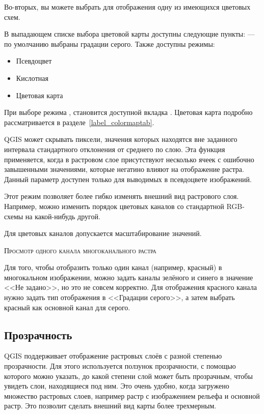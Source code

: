 Во-вторых, вы можете выбрать для отображения одну из имеющихся цветовых схем.

В выпадающем списке выбора цветовой карты доступны следующие пункты:
 --- по умолчанию выбраны градации серого. Также доступны режимы:
\begin{itemize}[label=--]
\item Псевдоцвет
\item Кислотная
\item Цветовая карта
\end{itemize}

При выборе режима , становится
доступной вкладка . Цветовая карта подробно рассматривается в разделе~\ref{label_colormaptab}.

QGIS может скрывать пиксели, значения которых находятся вне заданного
интервала стандартного отклонения от среднего по слою.
Эта функция применяется, когда в растровом слое присутствуют несколько ячеек
с ошибочно завышенными значениями, которые негатино влияют на отображение растра.
Данный параметр доступен только для выводимых в псевдоцвете изображений.


Этот режим позволяет более гибко изменять внешний вид растрового слоя.
Например, можно изменить порядок цветовых каналов со стандартной RGB-схемы на
какой-нибудь другой.

Для цветовых каналов допускается масштабирование значений.


\begin{Tip}\caption{\textsc{Просмотр одного канала многоканального растра}}
Для того, чтобы отобразить только один канал (например, красный) в
многокальном изображении, можно задать каналы зелёного и синего в значение
<<Не задано>>, но это не совсем корректно. Для отображения красного
канала нужно задать тип отображения в <<Градации серого>>, а затем
выбрать красный как основной канал для серого.
\end{Tip}

\subsection{Прозрачность} \label{rastertab:transparency}

QGIS поддерживает отображение растровых слоёв с разной степенью
прозрачности. Для этого используется
ползунок прозрачности, с помощью которого можно указать, до какой
степени слой может быть прозрачным, чтобы увидеть слои, находящиеся под
ним. Это очень удобно, когда загружено множество растровых слоев,
например растр с изображением рельефа и основной растр. Это позволит
сделать внешний вид карты более трехмерным.

